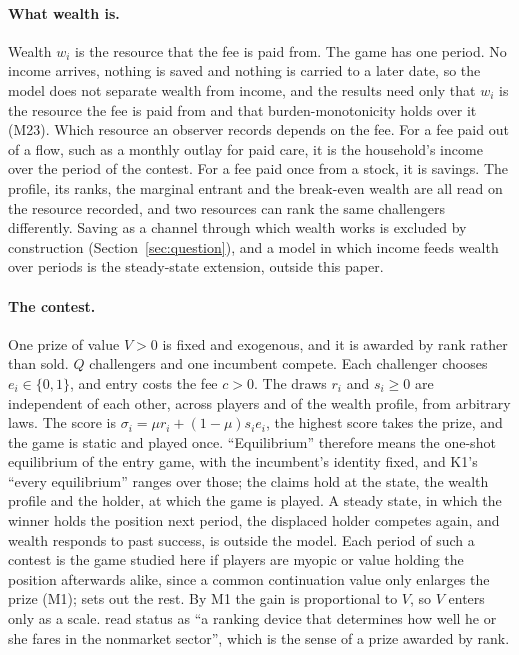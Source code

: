 \paragraph{What wealth is.} Wealth $w_i$ is the resource that the fee is paid
from. The game has one period. No income arrives, nothing is saved and nothing
is carried to a later date, so the model does not separate wealth from income,
and the results need only that $w_i$ is the resource the fee is paid from and
that burden-monotonicity holds over it (M23). Which resource an observer
records depends on the fee. For a fee paid out of a flow, such as a monthly
outlay for paid care, it is the household's income over the period of the
contest. For a fee paid once from a stock, it is savings. The profile, its
ranks, the marginal entrant and the break-even wealth are all read on the resource
recorded, and two resources can rank the same challengers differently. Saving
as a channel through which wealth works is excluded by construction
(Section~\ref{sec:question}), and a model in which income feeds wealth over
periods is the steady-state extension, outside this paper.

\paragraph{The contest.} One prize of value $V>0$ is fixed and exogenous, and
it is awarded by rank rather than sold. $Q$ challengers and one incumbent
compete. Each challenger chooses $e_i\in\{0,1\}$, and entry costs the fee $c>0$.
The draws $r_i$ and $s_i\ge0$ are independent of each other, across players and
of the wealth profile, from arbitrary laws. The score is
$\sigma_i=\mu r_i+(1-\mu)s_ie_i$, the highest score takes the prize, and the game
is static and played once. ``Equilibrium'' therefore means the one-shot
equilibrium of the entry game, with the incumbent's identity fixed, and K1's
``every equilibrium'' ranges over those; the claims hold at the state, the
wealth profile and the holder, at which the game is played. A steady state, in
which the winner holds the position next period, the displaced holder competes
again, and wealth responds to past success, is outside the model. Each period of
such a contest is the game studied here if players are myopic or value holding
the position afterwards alike, since a common continuation value only enlarges
the prize (M1);  sets out the rest. By M1 the gain is proportional to $V$, so $V$
enters only as a scale. \citet{ColeMailathPostlewaite1992} read status as ``a ranking
device that determines how well he or she fares in the nonmarket sector'', which
is the sense of a prize awarded by rank.

